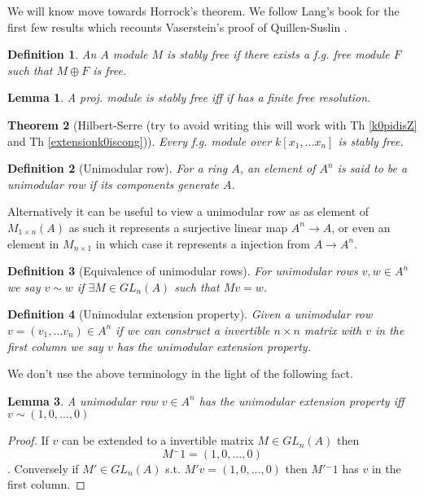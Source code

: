 \documentclass[12pt]{article}
\numberwithin{equation}{section}
\newtheorem{theorem}{Theorem}[section]
\newtheorem{definition}{Definition}[section]
\newtheorem{lemma}[theorem]{Lemma}
\begin{document}
	We will know move towards Horrock's theorem. We follow Lang's book for the first few results which recounts Vaserstein's proof of Quillen-Suslin \cite{lang02}.
	
	\begin{definition}
	An $A$ module $M$ is stably free if there exists a f.g. free module $F$ such that $M \oplus F$ is free.
	\end{definition}
	\begin{lemma}
	A proj. module is stably free iff if has a finite free resolution.
	\end{lemma}
	\begin{theorem}[Hilbert-Serre (try to avoid writing this will work with Th \ref{k0pidisZ} and Th \ref{extensionk0iscong})]
	Every f.g. module over $k[x_1,\dots x_n]$ is stably free.
	\end{theorem}
	
	
	\begin{definition}[Unimodular row]
		For a ring $A$, an element of $A^n$ is said to be a unimodular row if its components generate	$A$. 
	\end{definition}
	
	Alternatively it can be useful to view a unimodular row as as element of $M_{1 \times n} (A) $ as such it represents a surjective linear map $A^n \to A$, or even an element in $M_{n \times 1}$ in which case it represents a injection from $A \to A^n$.
	
	\begin{definition}[Equivalence of unimodular rows]
		For unimodular rows $v,w\in A^n$ we say $v \sim w $ if $\exists M \in GL_n(A)$ such that $Mv=w$.
	\end{definition}
	
	\begin{definition}[Unimodular extension property]
		Given a unimodular row $v=(v_1,\dots v_n) \in A^n$ if we can construct a invertible $n \times n $  matrix with $v$ in the first column we say $v$ has the unimodular extension property.
	\end{definition}
	
	We don't use the above terminology in the light of the following fact.
	
	\begin{lemma}
		A unimodular row $v \in A^n$ has the unimodular extension property iff $v \sim (1,0,\dots ,0)$
	\end{lemma}
	\begin{proof}
		If $v$ can be extended to a invertible matrix $M \in GL_n(A)$ then \[ M{^-1} = (1,0,\dots, 0) \].
		Conversely if $M' \in GL_n(A) $ s.t. $M'v=(1,0,\dots,0)$ then $M'{^-1}$ has $v$ in the first column.
	\end{proof}
	
\end{document}
